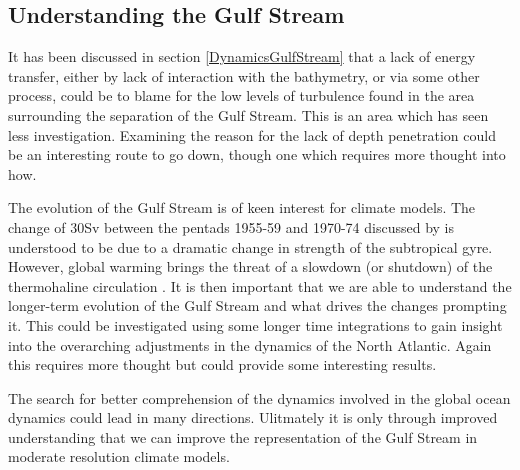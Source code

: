 \documentclass[..\EOYR.tex]{subfiles}
\begin{document}
\subsection{Understanding the Gulf Stream}
  
It has been discussed in section \ref{DynamicsGulfStream} that a lack of energy transfer, either by lack of interaction with the bathymetry, or via some other process, could be to blame for the low levels of turbulence found in the area surrounding the separation of the Gulf Stream. This is an area which has seen less investigation. Examining the reason for the lack of depth penetration could be an interesting route to go down, though one which requires more thought into how. %

The evolution of the Gulf Stream is of keen interest for climate models.
The change of 30Sv between the pentads 1955-59 and 1970-74 discussed by \citep{Greatbatch1991} is understood to be due to a dramatic change in strength of the subtropical gyre. 
However, global warming brings the threat of a slowdown (or shutdown) of the thermohaline circulation \citep{???}. 
It is then important that we are able to understand the longer-term evolution of the Gulf Stream and what drives the changes prompting it. 
This could be investigated using some longer time integrations to gain insight into the overarching adjustments in the dynamics of the North Atlantic. Again this requires more thought but could provide some interesting results.




The search for better comprehension of the dynamics involved in the global ocean dynamics could lead in many directions.
Ulitmately it is only through improved understanding that we can improve the representation of the Gulf Stream in moderate resolution climate models. 
\end{document}
